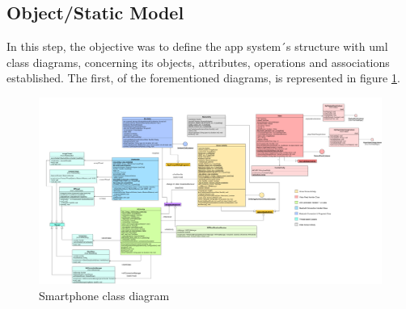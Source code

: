 \subsection{Object/Static Model}
In this step, the objective was to define the app system´s structure with \gls{uml} class diagrams, concerning its objects, attributes, operations and associations established.  The first, of the forementioned diagrams, is represented in figure \ref{fig:uml-android}.
%
\begin{figure}[!ht]
\centering
\includegraphics[width=\textwidth]{img/smartphone-static-diagram.png}
\caption{\label{fig:uml-android}Smartphone class diagram}
\end{figure}
%
